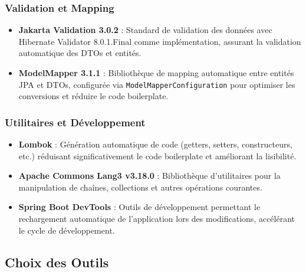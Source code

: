 \subsubsection{Validation et Mapping}

\begin{itemize}
    \item \textbf{Jakarta Validation 3.0.2} : Standard de validation des données avec Hibernate Validator 8.0.1.Final comme implémentation, assurant la validation automatique des DTOs et entités.

    \item \textbf{ModelMapper 3.1.1} : Bibliothèque de mapping automatique entre entités JPA et DTOs, configurée via \texttt{ModelMapperConfiguration} pour optimiser les conversions et réduire le code boilerplate.
\end{itemize}

\subsubsection{Utilitaires et Développement}

\begin{itemize}
    \item \textbf{Lombok} : Génération automatique de code (getters, setters, constructeurs, etc.) réduisant significativement le code boilerplate et améliorant la lisibilité.

    \item \textbf{Apache Commons Lang3 v3.18.0} : Bibliothèque d'utilitaires pour la manipulation de chaînes, collections et autres opérations courantes.

    \item \textbf{Spring Boot DevTools} : Outils de développement permettant le rechargement automatique de l'application lors des modifications, accélérant le cycle de développement.
\end{itemize}

\subsection{Choix des Outils}

